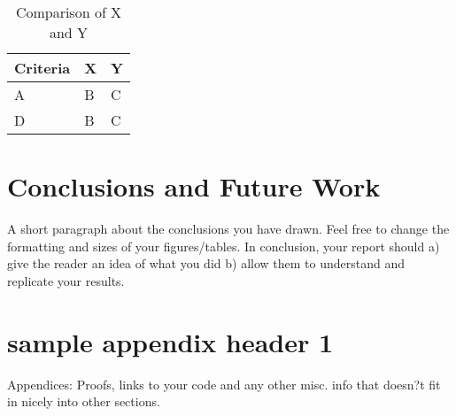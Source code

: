 \documentclass[12pt]{report}
\begin{document}
\begin{table}[ht]
\label{XYComparison}
\begin{center}
\begin{tabular} {l|l|l} %
\hline
\hline
\textbf{Criteria} & \textbf{X} & \textbf{Y}  \\
\hline
A & B & C \\
D & B & C \\
\hline 
\hline
\end{tabular}
\end{center}
\caption{Comparison of  X and Y}
\end{table}

\chapter{Conclusions and Future Work}
A short paragraph about the conclusions you have drawn. Feel free to change the formatting and sizes of your figures/tables. In conclusion, your report should a) give the reader an idea of what you did b) allow them to understand and replicate your results.


 

\appendix 
\chapter{sample appendix header 1}
Appendices: 
Proofs, links to your code and any other misc. info that doesn?t fit in nicely into other sections. 
\end{document}
